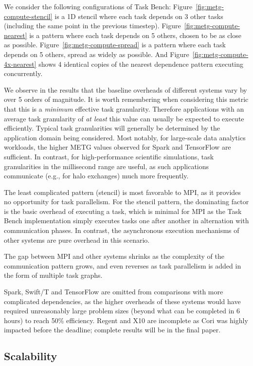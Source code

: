 We consider the following configurations of Task Bench:
Figure~\ref{fig:metg-compute-stencil} is a 1D stencil where each task
depends on 3 other tasks (including the same point in the previous
timestep). Figure~\ref{fig:metg-compute-nearest} is a pattern where
each task depends on 5 others, chosen to be as close as
possible. Figure~\ref{fig:metg-compute-spread} is a pattern where each
task depends on 5 others, spread as widely as possible. And
Figure~\ref{fig:metg-compute-4x-nearest} shows 4 identical copies of
the nearest dependence pattern executing concurrently.

We observe in the results that the baseline overheads of different
systems vary by over 5 orders of magnitude. It is worth
remembering when considering this metric that this is a \emph{minimum}
effective task granularity. Therefore applications with an average
task granularity of \emph{at least} this value can usually be expected
to execute efficiently. Typical task granularities will
generally be determined by the application domain being
considered. Most notably, for large-scale data analytics workloads, the higher METG values observed for Spark and
TensorFlow are sufficient. In contrast, for high-performance
scientific simulations, task granularities in the millisecond range
are useful, as such applications communicate (e.g., for halo
exchanges) much more frequently.

The least complicated pattern (stencil) is most favorable
to MPI, as it provides no
opportunity for task parallelism. For the stencil pattern, the
dominating factor is the basic overhead of executing a task, which is
minimal for MPI as the Task Bench implementation simply executes tasks one after another in alternation with
communication phases. In contrast, the asynchronous execution
mechanisms of other systems are pure overhead in this scenario.

The gap between MPI and other systems shrinks as the complexity of the
communication pattern grows, and even reverses as task parallelism is
added in the form of multiple task graphs.

Spark, Swift/T and TensorFlow
are omitted from comparisons with more complicated dependencies, as the higher overheads of these systems would have required
unreasonably large problem sizes (beyond what can be completed in 6
hours) to reach 50\% efficiency. Regent and X10 are incomplete as Cori was highly impacted before the deadline; complete results will be in the final paper.

\subsection{Scalability}
\label{subsec:scalability}

